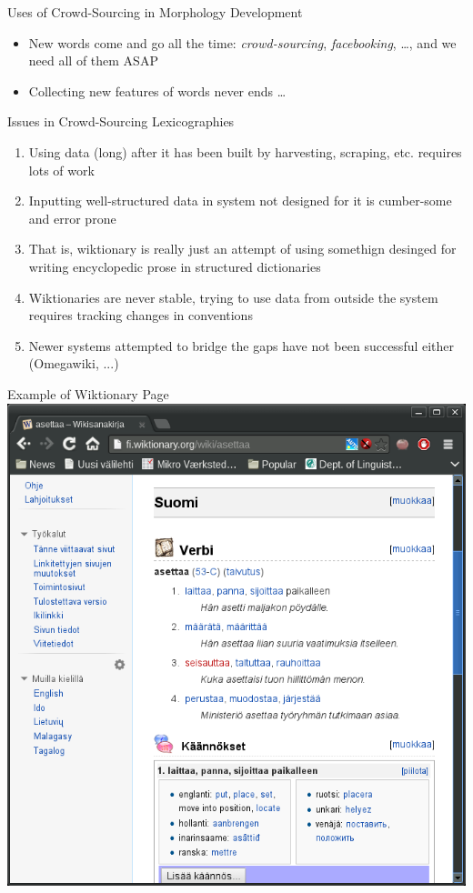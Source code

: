 \documentclass[t,12pt]{beamer}
\begin{document}
\begin{frame}{Uses of Crowd-Sourcing in Morphology Development}
    \begin{itemize}
        \item New words come and go all the time: \emph{crowd-sourcing}, 
            \emph{facebooking}, \ldots, and we need all of them ASAP
        \item Collecting new features of words never ends \ldots
    \end{itemize}
\end{frame}

\begin{frame}{Issues in Crowd-Sourcing Lexicographies}
    \begin{enumerate}
        \item Using data (long) after it has been built by harvesting, scraping,
            etc. requires lots of work
        \item Inputting well-structured data in system not designed for it is
            cumber-some and error prone
        \item That is, wiktionary is really just an attempt of using somethign
            desinged for writing encyclopedic prose in structured dictionaries
        \item Wiktionaries are never stable, trying to use data from outside
            the system requires tracking changes in conventions
        \item Newer systems attempted to bridge the gaps have not been 
            successful either (Omegawiki, ...)
    \end{enumerate}
\end{frame}

\begin{frame}[plain]{Example of Wiktionary Page}
    \includegraphics[keepaspectratio=true,width=1\paperwidth]{fiwikt-web}
\end{frame}
\end{document}
